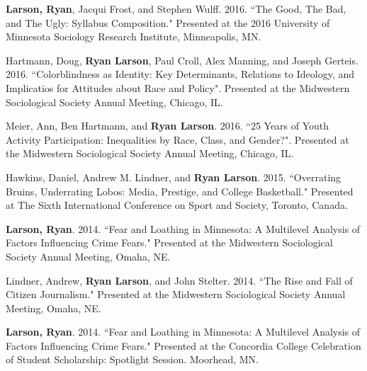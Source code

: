 \documentclass[letterpaper]{article}
\renewenvironment{itemize}{
  \begin{list}{}{
    \setlength{\leftmargin}{1.5em}
  }
}{
  \end{list}
}
\begin{document}
\begin{itemize}
\item \textbf{Larson, Ryan}, Jacqui Frost, and Stephen Wulff. 2016. ``The Good, The Bad, and The Ugly: Syllabus Composition." Presented at the 2016 University of Minnesota Sociology Research Institute, Minneapolis, MN. 
\item Hartmann, Doug, \textbf{Ryan Larson}, Paul Croll, Alex Manning,  and Joseph Gerteis. 2016. ``Colorblindness as Identity:  Key Determinants, Relations to Ideology, and Implicatios for Attitudes about Race and Policy". Presented at the Midwestern Sociological Society Annual Meeting, Chicago, IL. 
\item Meier, Ann, Ben Hartmann, and \textbf{Ryan Larson}. 2016. ``25 Years of Youth Activity Participation: Inequalities by Race, Class, and Gender?". Presented at the Midwestern Sociological Society Annual Meeting, Chicago, IL. 
\item Hawkins, Daniel, Andrew M. Lindner, and \textbf{Ryan Larson}. 2015. ``Overrating Bruins, Underrating Lobos: Media, Prestige, and College Basketball." Presented at The Sixth International Conference on Sport and Society, Toronto, Canada.
\item \textbf{Larson, Ryan}. 2014. ``Fear and Loathing in Minnesota: A Multilevel Analysis of Factors Influencing Crime Fears." Presented at the Midwestern Sociological Society Annual Meeting, Omaha, NE.
\item Lindner, Andrew, \textbf{Ryan Larson}, and John Stelter. 2014. ``The Rise and Fall of Citizen Journalism." Presented at the Midwestern Sociological Society Annual Meeting, Omaha, NE. 
\item \textbf{Larson, Ryan}. 2014. ``Fear and Loathing in Minnesota: A Multilevel Analysis of Factors Influencing Crime Fears." Presented at the Concordia College Celebration of Student Scholarship: Spotlight Session. Moorhead, MN. 



\end{itemize}
\end{document}
